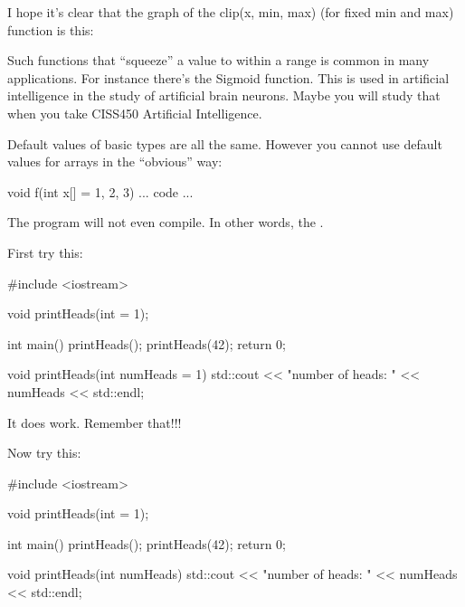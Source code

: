 I hope it's clear that the graph of the clip(x, min, max) (for fixed min and max) function is this:


Such functions that ``squeeze'' a value to within a range is common in many applications. For instance there's the Sigmoid function. This is used in artificial intelligence in the study of artificial brain neurons. Maybe you will study that when you take CISS450 Artificial Intelligence.



Default values of basic types are all the same. However you cannot use default values for arrays in the ``obvious'' way:

\begin{consolethree}[escapeinside=||]
void f(int x[] = {1, 2, 3})
{
    ... code ...
}
\end{consolethree}

The program will not even compile. In other words, the .


\newpage{}

First try this:

\begin{consolethree}[escapeinside=||]
#include <iostream>

void printHeads(int = 1);

int main()
{
    printHeads();
    printHeads(42);
    return 0;
}

void printHeads(int numHeads = 1)
{
    std::cout << "number of heads: " << numHeads
              << std::endl;
}
\end{consolethree}

It does  work. Remember that!!!

Now try this:

\begin{consolethree}[escapeinside=||]
#include <iostream>

void printHeads(int = 1);

int main()
{
    printHeads();
    printHeads(42);
    return 0;
}

void printHeads(int numHeads)
{
    std::cout << "number of heads: " << numHeads
              << std::endl;
}
\end{consolethree}

